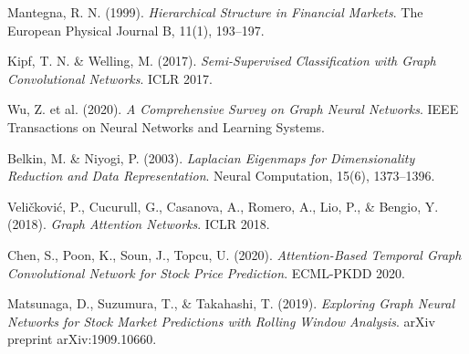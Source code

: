 \documentclass[12pt]{article}
\begin{document}

\begin{thebibliography}{9}

Mantegna, R. N. (1999). 
\textit{Hierarchical Structure in Financial Markets}. 
The European Physical Journal B, 11(1), 193--197.

Kipf, T. N. \& Welling, M. (2017). 
\textit{Semi-Supervised Classification with Graph Convolutional Networks}. 
ICLR 2017.

Wu, Z. et al. (2020). 
\textit{A Comprehensive Survey on Graph Neural Networks}. 
IEEE Transactions on Neural Networks and Learning Systems.

Belkin, M. \& Niyogi, P. (2003). 
\textit{Laplacian Eigenmaps for Dimensionality Reduction and Data Representation}. 
Neural Computation, 15(6), 1373--1396.

Veličković, P., Cucurull, G., Casanova, A., Romero, A., Lio, P., \& Bengio, Y. (2018).
\textit{Graph Attention Networks}.
ICLR 2018.

Chen, S., Poon, K., Soun, J., Topcu, U. (2020).
\textit{Attention-Based Temporal Graph Convolutional Network for Stock Price Prediction}.
ECML-PKDD 2020.

Matsunaga, D., Suzumura, T., & Takahashi, T. (2019).
\textit{Exploring Graph Neural Networks for Stock Market Predictions with Rolling Window Analysis}.
arXiv preprint arXiv:1909.10660.

\end{thebibliography}
\end{document}
